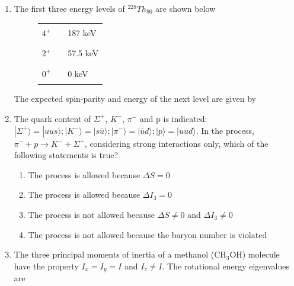 \documentclass[journal,12pt,onecolumn]{IEEEtran}
\theoremstyle{remark}
\begin{document}
\begin{enumerate}
\item The first three energy levels of ${}^{228}Th_{90}$ are shown below
	\begin{figure}[H] \centering
	\begin{tabular}{r c l}
		$4^+$ & \rule{3cm}{0.4pt} & 187 keV \\
		$2^+$ & \rule{3cm}{0.4pt} & 57.5 keV \\
		$0^+$ & \rule{3cm}{0.4pt} & 0 keV \\
	\end{tabular}
	\end{figure}
The expected spin-parity and energy of the next level are given by\hfill{}

\begin{enumerate}  \end{enumerate}

\item The quark content of $\Sigma^{+}$, $K^{-}$, $\pi^{-}$ and p is indicated: $|\Sigma^{+}\rangle=|uus\rangle; |K^{-}\rangle=|s\bar{u}\rangle; |\pi^{-}\rangle=|\bar{u}d\rangle; |p\rangle=|uud\rangle$. In the process, $\pi^{-} + p \rightarrow K^{-} + \Sigma^{+}$, considering strong interactions only, which of the following statements is true?\hfill{}

\begin{enumerate}
	\item The process is allowed because $\Delta S = 0$
	\item The process is allowed because $\Delta I_3 = 0$
	\item The process is not allowed because $\Delta S \neq 0$ and $\Delta I_3 \neq 0$
	\item The process is not allowed because the baryon number is violated
\end{enumerate}

\item The three principal moments of inertia of a methanol (CH$_3$OH) molecule have the property $I_x = I_y = I$ and $I_z \neq I$. The rotational energy eigenvalues are\hfill{}

\begin{enumerate}  \end{enumerate}


\end{enumerate}
\end{document}
